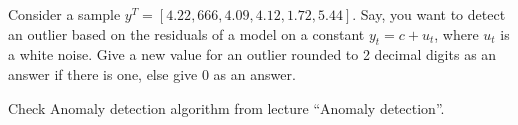 
\begin{question}
Consider a sample \(y^T = [4.22, 666, 4.09, 4.12, 1.72, 5.44]\). Say, you want to detect an outlier based on the residuals of a model on a constant \(y_t=c+u_t\), where \(u_t\) is a white noise. Give a new value for an outlier rounded to 2 decimal digits as an answer if there is one, else give 0 as an answer.
\end{question}

\begin{solution}
Check Anomaly detection algorithm from lecture ``Anomaly detection''.
\end{solution}

